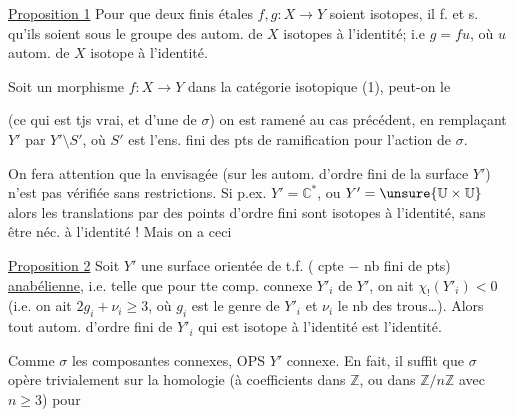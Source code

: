 \uline{Proposition 1} Pour que deux   finis étales $f,g:X\longrightarrow Y$ soient isotopes, il f. et s. qu'ils soient  sous le groupe des autom. de $X$ isotopes à l'identité; i.e $g=fu$, où $u$ autom. de $X$ isotope à l'identité.

Soit un  morphisme $f:X\longrightarrow Y$ dans la catégorie isotopique (1), peut-on le

(ce qui est  tjs vrai, et   d'une  de $\sigma$) on est ramené au cas précédent, en  remplaçant $Y'$ par $Y'\setminus S'$, où $S'$ est l'ens. fini des pts de ramification pour l'action de $\sigma$. 

On fera attention que la   envisagée  (sur les autom. d'ordre fini de la surface $Y'$) n'est pas vérifiée sans restrictions. Si p.ex. $Y'=\mathbb{C}^*$, ou $Y'=\unsure{\mathbb{U}\times\mathbb{U}}$ alors les translations par des points d'ordre fini sont isotopes à l'identité, sans être néc.  à l'identité ! Mais on a ceci

\uline{Proposition 2} Soit $Y'$ une surface orientée de t.f. ( cpte $-$ nb fini de pts) \uline{anabélienne}, i.e. telle que pour tte comp. connexe $Y'_i$ de $Y'$, on ait $\chi_!(Y'_i)<0$ (i.e. on ait $2g_i+\nu_i\geq 3$, où $g_i$ est le genre de $Y'_i$ et $\nu_i$ le nb des trous\ldots). Alors tout autom. \inserted{$\sigma$} d'ordre fini de $Y'_i$ qui est isotope à l'identité est l'identité.

Comme $\sigma$  les composantes connexes, OPS $Y'$ connexe. En fait, il suffit que $\sigma$ opère trivialement sur la homologie  (à coefficients dans $\mathbb{Z}$, ou dans  $\mathbb{Z}/n\mathbb{Z}$ avec $n\geq3$) pour

